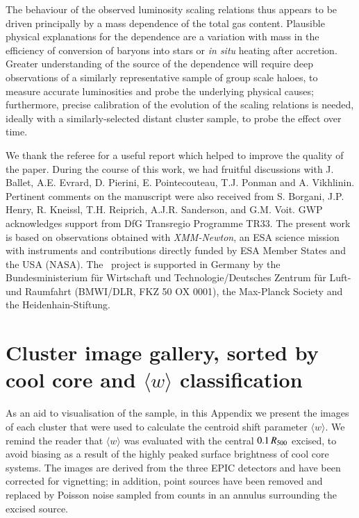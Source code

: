 \documentclass[oldversion]{aa}
\begin{document}
The behaviour of the observed luminosity scaling relations thus appears to be driven principally by a mass dependence of the total gas content. Plausible physical explanations for the dependence are a variation with mass in the efficiency of conversion of baryons into stars or {\it in situ} heating after accretion. Greater understanding of the source of the dependence will require deep observations of a similarly representative sample of group scale haloes, to measure accurate luminosities and probe the underlying physical causes; furthermore, precise calibration of the evolution of the scaling relations is needed, ideally with a similarly-selected distant cluster sample, to probe the effect over time. 

\begin{acknowledgements}

We thank the referee for a useful report which helped to improve the quality of the paper. During the course of this work, we had fruitful discussions with J. Ballet, A.E. Evrard, D. Pierini, E. Pointecouteau, T.J. Ponman and A. Vikhlinin. Pertinent comments on the manuscript were also received from S. Borgani, J.P. Henry, R. Kneissl, T.H. Reiprich, A.J.R. Sanderson, and G.M. Voit. GWP acknowledges support from DfG Transregio Programme TR33. The present work is
based on observations obtained with {\it XMM-Newton}, an ESA science
mission with instruments and contributions directly funded by ESA
Member States and the USA (NASA). The \xmm\ project is supported
in Germany by the Bundesministerium f\"ur Wirtschaft und
Technologie/Deutsches Zentrum f\"ur Luft- und Raumfahrt (BMWI/DLR, FKZ
50 OX 0001), the Max-Planck Society and the Heidenhain-Stiftung.
\end{acknowledgements}


 


\appendix

\section{Cluster image gallery, sorted by cool core and $\langle w \rangle$ classification}\label{app:app1}

As an aid to visualisation of the sample, in this Appendix we present the images of each cluster that were used to calculate the centroid shift parameter $\langle w \rangle$. We remind the reader that $\langle w \rangle$ was evaluated with the central $0.1\,R_{500}$ excised, to avoid biasing as a result of the highly peaked surface brightness of cool core systems. The images are derived from the three EPIC detectors and have been corrected for vignetting; in addition, point sources have been removed and replaced by Poisson noise sampled from counts in an annulus surrounding the excised source. 
\end{document}
